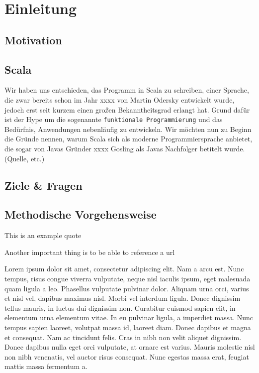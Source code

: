 \chapter{Einleitung}\label{chap:intro}
\section{Motivation}

\section{Scala}
Wir haben uns entschieden, das Programm in Scala zu schreiben, einer Sprache, die zwar bereits schon im Jahr xxxx von Martin Odersky entwickelt wurde, jedoch erst seit kurzem einen großen Bekanntheitsgrad erlangt hat. Grund dafür ist der Hype um die sogenannte \texttt{funktionale Programmierung} und das Bedürfnis, Anwendungen nebenläufig zu entwickeln. Wir möchten nun zu Beginn die Gründe nennen, warum Scala sich als moderne Programmiersprache anbietet, die sogar von Javas Gründer xxxx Gosling als Javas Nachfolger betitelt wurde. (Quelle, etc.)
\section{Ziele \& Fragen}
\section{Methodische Vorgehensweise}
This is an example quote \cite{TKerst12}

Another important thing is to be able to reference a url \cite{referenceURL}

Lorem ipsum dolor sit amet, consectetur adipiscing elit. Nam a arcu est. Nunc tempus, risus congue viverra vulputate, neque nisl iaculis ipsum, eget malesuada quam ligula a leo. Phasellus vulputate pulvinar dolor. Aliquam urna orci, varius et nisl vel, dapibus maximus nisl. Morbi vel interdum ligula. Donec dignissim tellus mauris, in luctus dui dignissim non. Curabitur euismod sapien elit, in elementum urna elementum vitae. In eu pulvinar ligula, a imperdiet massa. Nunc tempus sapien laoreet, volutpat massa id, laoreet diam. Donec dapibus et magna et consequat. Nam ac tincidunt felis. Cras in nibh non velit aliquet dignissim. Donec dapibus nulla eget orci vulputate, at ornare est varius. Mauris molestie nisl non nibh venenatis, vel auctor risus consequat. Nunc egestas massa erat, feugiat mattis massa fermentum a.

